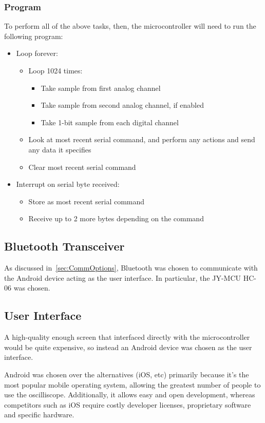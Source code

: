 
\subsubsection{Program}
To perform all of the above tasks, then, the microcontroller will need to run
the following program:

\begin{itemize}
  \item Loop forever:
    \begin{itemize}
      \item Loop 1024 times:
        \begin{itemize}
          \item Take sample from first analog channel
          \item Take sample from second analog channel, if enabled
          \item Take 1-bit sample from each digital channel
        \end{itemize}
      \item Look at most recent serial command, and perform any actions and send
      any data it specifies
      \item Clear most recent serial command
    \end{itemize}
  \item Interrupt on serial byte received:
    \begin{itemize}
      \item Store as most recent serial command
      \item Receive up to 2 more bytes depending on the command
    \end{itemize}
\end{itemize}


\subsection{Bluetooth Transceiver}
\label{sec:wireless_transceiver}

As discussed in~\cref{sec:CommOptions}, Bluetooth was chosen to communicate with
the Android device acting as the user interface. In particular, the JY-MCU HC-06
was chosen.

\subsection{User Interface}
\label{sec:user_interface}

A high-quality enough screen that interfaced directly with the microcontroller
would be quite expensive, so instead an Android device was chosen as the user
interface.

Android was chosen over the alternatives (iOS, etc) primarily because it's the
most popular mobile operating system, allowing the greatest number of people to
use the oscilliscope. Additionally, it allows easy and open development, whereas
competitors such as iOS require costly developer licenses, proprietary software
and specific hardware.
